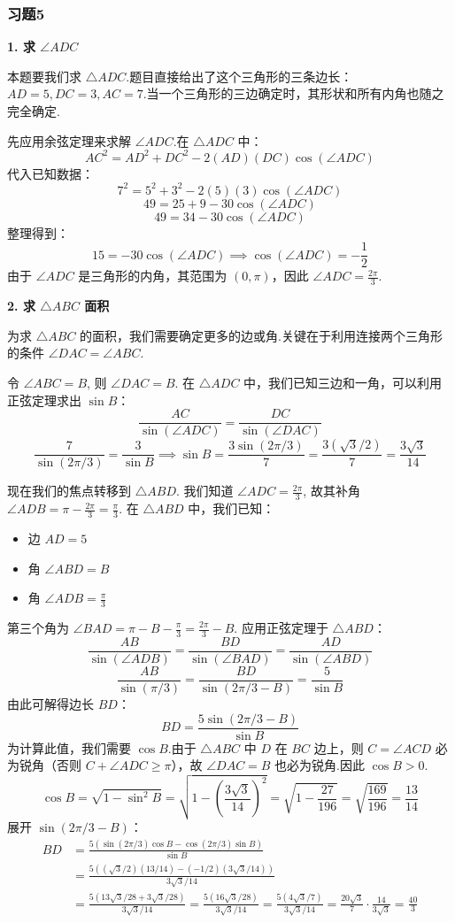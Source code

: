 \subsubsection{习题5}
\begin{solution}
	\textbf{1. 求 $\angle ADC$}
	
	本题要我们求 $\triangle ADC$.题目直接给出了这个三角形的三条边长：$AD=5, DC=3, AC=7$.当一个三角形的三边确定时，其形状和所有内角也随之完全确定.
	
	先应用余弦定理来求解 $\angle ADC$.在 $\triangle ADC$ 中：
	\[
	AC^2 = AD^2 + DC^2 - 2(AD)(DC)\cos(\angle ADC)
	\]
	代入已知数据：
	\[
	7^2 = 5^2 + 3^2 - 2(5)(3)\cos(\angle ADC)
	\]
	\[
	49 = 25 + 9 - 30\cos(\angle ADC)
	\]
	\[
	49 = 34 - 30\cos(\angle ADC)
	\]
	整理得到：
	\[
	15 = -30\cos(\angle ADC) \implies \cos(\angle ADC) = -\frac{1}{2}
	\]
	由于 $\angle ADC$ 是三角形的内角，其范围为 $(0, \pi)$，因此 $\angle ADC = \frac{2\pi}{3}$.
	
	\textbf{2. 求 $\triangle ABC$ 面积}
	
	为求 $\triangle ABC$ 的面积，我们需要确定更多的边或角.关键在于利用连接两个三角形的条件 $\angle DAC = \angle ABC$.
	
	令 $\angle ABC = B$, 则 $\angle DAC = B$.
	在 $\triangle ADC$ 中，我们已知三边和一角，可以利用正弦定理求出 $\sin B$：
	\[
	\frac{AC}{\sin(\angle ADC)} = \frac{DC}{\sin(\angle DAC)}
	\]
	\[
	\frac{7}{\sin(2\pi/3)} = \frac{3}{\sin B} \implies \sin B = \frac{3\sin(2\pi/3)}{7} = \frac{3(\sqrt{3}/2)}{7} = \frac{3\sqrt{3}}{14}
	\]
	
	现在我们的焦点转移到 $\triangle ABD$.
	我们知道 $\angle ADC = \frac{2\pi}{3}$, 故其补角 $\angle ADB = \pi - \frac{2\pi}{3} = \frac{\pi}{3}$.
	在 $\triangle ABD$ 中，我们已知：
	\begin{itemize}
		\item 边 $AD = 5$
		\item 角 $\angle ABD = B$
		\item 角 $\angle ADB = \frac{\pi}{3}$
	\end{itemize}
	第三个角为 $\angle BAD = \pi - B - \frac{\pi}{3} = \frac{2\pi}{3}-B$.
	应用正弦定理于 $\triangle ABD$：
	\[
	\frac{AB}{\sin(\angle ADB)} = \frac{BD}{\sin(\angle BAD)} = \frac{AD}{\sin(\angle ABD)}
	\]
	\[
	\frac{AB}{\sin(\pi/3)} = \frac{BD}{\sin(2\pi/3 - B)} = \frac{5}{\sin B}
	\]
	由此可解得边长 $BD$：
	\[
	BD = \frac{5\sin(2\pi/3 - B)}{\sin B}
	\]
	为计算此值，我们需要 $\cos B$.由于 $\triangle ABC$ 中 $D$ 在 $BC$ 边上，则 $C = \angle ACD$ 必为锐角（否则 $C+\angle ADC \ge \pi$），故 $\angle DAC = B$ 也必为锐角.因此 $\cos B > 0$.
	\[
	\cos B = \sqrt{1-\sin^2 B} = \sqrt{1 - \left(\frac{3\sqrt{3}}{14}\right)^2} = \sqrt{1-\frac{27}{196}} = \sqrt{\frac{169}{196}} = \frac{13}{14}
	\]
	展开 $\sin(2\pi/3 - B)$：
	\begin{align*}
		BD &= \frac{5(\sin(2\pi/3)\cos B - \cos(2\pi/3)\sin B)}{\sin B} \\
		&= \frac{5((\sqrt{3}/2)(13/14) - (-1/2)(3\sqrt{3}/14))}{3\sqrt{3}/14} \\
		&= \frac{5(13\sqrt{3}/28 + 3\sqrt{3}/28)}{3\sqrt{3}/14} = \frac{5(16\sqrt{3}/28)}{3\sqrt{3}/14} = \frac{5(4\sqrt{3}/7)}{3\sqrt{3}/14} = \frac{20\sqrt{3}}{7} \cdot \frac{14}{3\sqrt{3}} = \frac{40}{3}
	\end{align*}
	

\end{solution}
